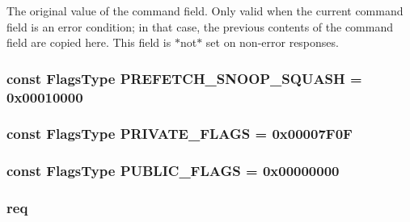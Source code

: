 The original value of the command field. Only valid when the current command field is an error condition; in that case, the previous contents of the command field are copied here. This field is $\ast$not$\ast$ set on non-\/error responses. \hypertarget{classPacket_ae2bdbe737a4cf46b8bedebcaa602d23a}{
\subsubsection[{PREFETCH\_\-SNOOP\_\-SQUASH}]{\setlength{\rightskip}{0pt plus 5cm}const {\bf FlagsType} {\bf PREFETCH\_\-SNOOP\_\-SQUASH} = 0x00010000}}
\label{classPacket_ae2bdbe737a4cf46b8bedebcaa602d23a}
\hypertarget{classPacket_aa377b218207b557079f48b02e7acf167}{
\subsubsection[{PRIVATE\_\-FLAGS}]{\setlength{\rightskip}{0pt plus 5cm}const {\bf FlagsType} {\bf PRIVATE\_\-FLAGS} = 0x00007F0F}}
\label{classPacket_aa377b218207b557079f48b02e7acf167}
\hypertarget{classPacket_aedf1d129016ac677627a1e3c2ee6b59a}{
\subsubsection[{PUBLIC\_\-FLAGS}]{\setlength{\rightskip}{0pt plus 5cm}const {\bf FlagsType} {\bf PUBLIC\_\-FLAGS} = 0x00000000}}
\label{classPacket_aedf1d129016ac677627a1e3c2ee6b59a}
\hypertarget{classPacket_a956cd41d82347558b9c0a5b0474903f2}{
\subsubsection[{req}]{ {\bf req}}}
\label{classPacket_a956cd41d82347558b9c0a5b0474903f2}


